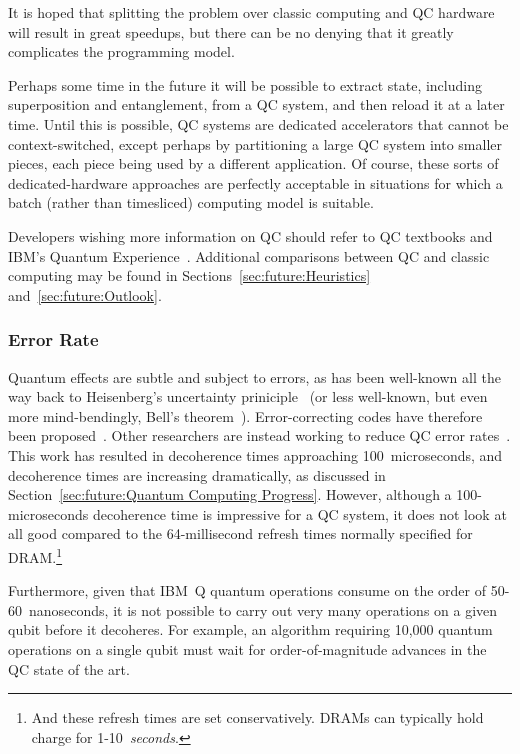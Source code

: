 It is hoped that splitting the problem over classic computing and
QC hardware will result in great speedups, but there can be no denying
that it greatly complicates the programming model.

Perhaps some time in the future it will be possible to extract
state, including superposition and entanglement, from a QC system,
and then reload it at a later time.
Until this is possible, QC systems are dedicated accelerators
that cannot be context-switched, except perhaps by partitioning
a large QC system into smaller pieces, each piece being used by
a different application.
Of course, these sorts of dedicated-hardware approaches are perfectly
acceptable in situations for which a batch (rather than timesliced)
computing model is suitable.

Developers wishing more information on QC should refer to QC textbooks
and IBM's Quantum Experience~\cite{IBM2016QuantumExperience}.
Additional comparisons between QC and classic computing may be
found in Sections~\ref{sec:future:Heuristics} and~\ref{sec:future:Outlook}.

\subsubsection{Error Rate}
\label{sec:future:Error Rate}

Quantum effects are subtle and subject to errors, as has been
well-known all the way back to
Heisenberg's uncertainty priniciple~\cite{WeinerHeisenberg1927Uncertain}
(or less well-known, but even more mind-bendingly,
Bell's theorem~\cite{JohnSBell1964EPRparadox}).
Error-correcting codes have therefore been
proposed~\cite{ADCorcoles2015QuantumErrorDetection}.
Other researchers are instead working to reduce QC error
rates~\cite{PhysRevB.77.180502,PhysRevLett.107.240501,PhysRevLett.111.080502,PhysRevB.86.100506,KristanTemme2016QC-error-mitigation}.
This work has resulted in decoherence times approaching 100~microseconds,
and decoherence times are increasing dramatically, as discussed in
Section~\ref{sec:future:Quantum Computing Progress}.
However, although a 100-microseconds decoherence time is impressive for
a QC system, it does not look at all good compared to the 64-millisecond
refresh times normally specified for DRAM.\footnote{
	And these refresh times are set conservatively.
	DRAMs can typically hold charge for 1-10~\emph{seconds}.}

Furthermore, given that IBM~Q quantum operations consume on the order of
50-60~nanoseconds, it is not possible to carry out very many
operations on a given qubit before it decoheres.
For example, an algorithm requiring 10,000 quantum operations on
a single qubit must wait for order-of-magnitude advances in
the QC state of the art.

